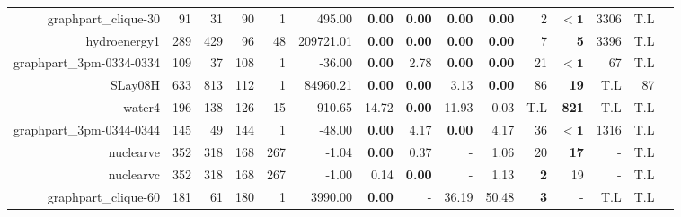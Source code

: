 \begin{table*}[t]
\begin{tabular}{|r|r|r|r|r||r||r|r|r|r||r|r|r|r|r|}
             graphpart\_clique-30 &           91 &           31 &          90 &            1 &              495.00 &  \textbf{0.00} & \textbf{0.00} &  \textbf{0.00} & \textbf{0.00} &            2 &         $\bm{< 1}$ &         3306 &          T.L \\ 
                     hydroenergy1 &          289 &          429 &          96 &           48 &           209721.01 &  \textbf{0.00} & \textbf{0.00} &  \textbf{0.00} & \textbf{0.00} &            7 &         \textbf{5} &         3396 &          T.L \\ 
         graphpart\_3pm-0334-0334 &          109 &           37 &         108 &            1 &              -36.00 &  \textbf{0.00} &          2.78 &  \textbf{0.00} & \textbf{0.00} &           21 &         $\bm{< 1}$ &           67 &          T.L \\ 
                          SLay08H &          633 &          813 &         112 &            1 &            84960.21 &  \textbf{0.00} & \textbf{0.00} &           3.13 & \textbf{0.00} &           86 &        \textbf{19} &          T.L &           87 \\ 
                           water4 &          196 &          138 &         126 &           15 &              910.65 &          14.72 & \textbf{0.00} &          11.93 &          0.03 &          T.L &       \textbf{821} &          T.L &          T.L \\ 
         graphpart\_3pm-0344-0344 &          145 &           49 &         144 &            1 &              -48.00 &  \textbf{0.00} &          4.17 &  \textbf{0.00} &          4.17 &           36 &         $\bm{< 1}$ &         1316 &          T.L \\ 
                        nuclearve &          352 &          318 &         168 &          267 &               -1.04 &  \textbf{0.00} &          0.37 &              - &          1.06 &           20 &        \textbf{17} &            - &          T.L \\ 
                        nuclearvc &          352 &          318 &         168 &          267 &               -1.00 &           0.14 & \textbf{0.00} &              - &          1.13 &   \textbf{2} &                 19 &            - &          T.L \\ 
             graphpart\_clique-60 &          181 &           61 &         180 &            1 &             3990.00 &  \textbf{0.00} &             - &          36.19 &         50.48 &   \textbf{3} &                  - &          T.L &          T.L \\ 

\end{tabular}
\end{table*}
